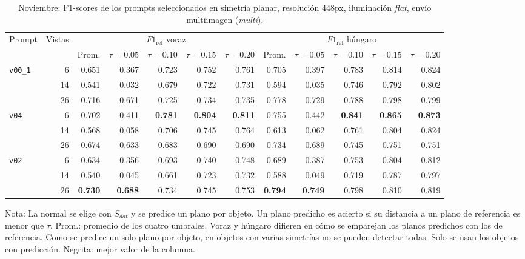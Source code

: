 \begin{table}[htbp]
\centering
\caption{Noviembre: F1-scores de los prompts seleccionados en simetría planar, resolución 448px, iluminación \textit{flat}, envío multiimagen (\textit{multi}).}
\label{tab:nov_plane_448_f1}
\begin{lrbox}{\tablebox}
\begin{adjustbox}{max width=\textwidth}
\begin{tabular}{lrrrrrrrrrrr}
\toprule
\multirow{2}{*}{Prompt} & \multirow{2}{*}{Vistas} & \multicolumn{5}{c}{$F1_{\mathrm{ref}}$ voraz} & \multicolumn{5}{c}{$F1_{\mathrm{ref}}$ húngaro} \\
\cmidrule(lr){3-7} \cmidrule(lr){8-12}
 &  & Prom. & $\tau{=}0.05$ & $\tau{=}0.10$ & $\tau{=}0.15$ & $\tau{=}0.20$ & Prom. & $\tau{=}0.05$ & $\tau{=}0.10$ & $\tau{=}0.15$ & $\tau{=}0.20$ \\
\midrule
\multirow{3}{*}{\texttt{v00\_1}} & 6 & 0.651 & 0.367 & 0.723 & 0.752 & 0.761 & 0.705 & 0.397 & 0.783 & 0.814 & 0.824 \\
 & 14 & 0.541 & 0.032 & 0.679 & 0.722 & 0.731 & 0.594 & 0.035 & 0.746 & 0.792 & 0.802 \\
 & 26 & 0.716 & 0.671 & 0.725 & 0.734 & 0.735 & 0.778 & 0.729 & 0.788 & 0.798 & 0.799 \\
\midrule
\multirow{3}{*}{\texttt{v04}} & 6 & 0.702 & 0.411 & \textbf{0.781} & \textbf{0.804} & \textbf{0.811} & 0.755 & 0.442 & \textbf{0.841} & \textbf{0.865} & \textbf{0.873} \\
 & 14 & 0.568 & 0.058 & 0.706 & 0.745 & 0.764 & 0.613 & 0.062 & 0.761 & 0.804 & 0.824 \\
 & 26 & 0.674 & 0.633 & 0.683 & 0.690 & 0.690 & 0.734 & 0.689 & 0.745 & 0.751 & 0.751 \\
\midrule
\multirow{3}{*}{\texttt{v02}} & 6 & 0.634 & 0.356 & 0.693 & 0.740 & 0.748 & 0.689 & 0.387 & 0.753 & 0.804 & 0.812 \\
 & 14 & 0.540 & 0.045 & 0.661 & 0.723 & 0.732 & 0.588 & 0.049 & 0.719 & 0.787 & 0.797 \\
 & 26 & \textbf{0.730} & \textbf{0.688} & 0.734 & 0.745 & 0.753 & \textbf{0.794} & \textbf{0.749} & 0.798 & 0.810 & 0.819 \\
\bottomrule
\end{tabular}
\end{adjustbox}
\end{lrbox}
\usebox{\tablebox}

\vspace{1.5ex}
\begin{minipage}{\wd\tablebox}
\footnotesize
Nota: La normal se elige con $S_{dat}$ y se predice un plano por objeto. Un plano predicho es acierto si su distancia a un plano de referencia es menor que $\tau$. Prom.: promedio de los cuatro umbrales. Voraz y húngaro difieren en cómo se emparejan los planos predichos con los de referencia. Como se predice un solo plano por objeto, en objetos con varias simetrías no se pueden detectar todas. Solo se usan los objetos con predicción. Negrita: mejor valor de la columna.
\end{minipage}
\end{table}



